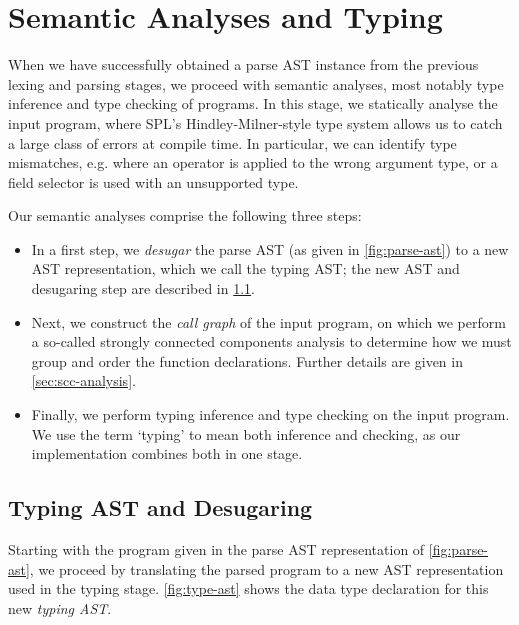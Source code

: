\chapter{Semantic Analyses and Typing} \label{chp:semantic-analyses}

When we have successfully obtained a parse AST instance from the previous lexing
and parsing stages, we proceed with semantic analyses, most notably type
inference and type checking of programs.
In this stage, we statically analyse the input program, where SPL's
Hindley-Milner-style type system allows us to catch a large class of errors
at compile time. In particular, we can identify type mismatches, e.g. where
an operator is applied to the wrong argument type, or a field selector is used
with an unsupported type.

Our semantic analyses comprise the following three steps:
\begin{itemize}
  \item In a first step, we \emph{desugar} the parse AST (as given in
        \cref{fig:parse-ast}) to a new AST representation, which we call the
        typing AST; the new AST and desugaring step are described in
        \cref{sec:desugaring}.
  \item Next, we construct the \emph{call graph} of the input program, on which
        we perform a so-called strongly connected components analysis to
        determine how we must group and order the function declarations.
        Further details are given in \cref{sec:scc-analysis}.
  \item Finally, we perform typing inference and type checking on the input
        program. We use the term `typing' to mean both inference and checking,
        as our implementation combines both in one stage.
\end{itemize}


\section{Typing AST and Desugaring} \label{sec:desugaring}

Starting with the program given in the parse AST representation of
\cref{fig:parse-ast}, we proceed by translating the parsed program to a new AST
representation used in the typing stage. \cref{fig:type-ast} shows the data type
declaration for this new \emph{typing AST}.

